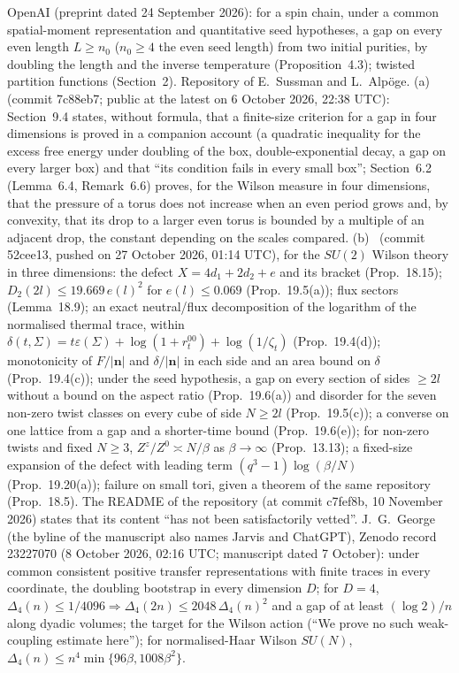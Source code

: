 \documentclass[11pt,a4paper]{article}
\theoremstyle{plain}
\theoremstyle{definition}
\theoremstyle{remark}
\numberwithin{equation}{section}
\begin{document}
 OpenAI \cite{OAIH26} (preprint dated 24 September 2026): for a spin chain, under a common spatial-moment representation and quantitative seed hypotheses, a gap on every even length $L\ge n_0$ ($n_0\ge4$ the even seed length) from two initial purities, by doubling the length and the inverse temperature (Proposition~4.3); twisted partition functions (Section~2).
 Repository \cite{SA26} of E.~Sussman and L.~Alp\"oge. (a)~ (commit 7c88eb7; public at the latest on 6 October 2026, 22:38 UTC): Section~9.4 states, without formula, that a finite-size criterion for a gap in four dimensions is proved in a companion account
(a quadratic inequality for the excess free energy under doubling of the box, double-exponential decay, a gap on every larger box) and that ``its condition fails in every small box''; Section~6.2 (Lemma~6.4, Remark~6.6) proves, for the Wilson measure in four dimensions,
that the pressure of a torus does not increase when an even period grows and, by convexity, that its drop to a larger even torus is bounded by a multiple of an adjacent drop, the constant depending on the scales compared.
(b)~ (commit 52cee13, pushed on 27 October 2026, 01:14 UTC), for the $SU(2)$ Wilson theory in three dimensions: the defect $X=4d_1+2d_2+e$ and its bracket (Prop.~18.15); $D_2(2l)\le19.669\,e(l)^2$ for $e(l)\le0.069$ (Prop.~19.5(a));
flux sectors (Lemma~18.9); an exact neutral/flux decomposition of the logarithm of the normalised thermal trace, within $\delta(t,\Sigma)=t\varepsilon(\Sigma)+\log(1+r_t^{00})+\log(1/\zeta_t)$ (Prop.~19.4(d)); monotonicity of $F/|\mathbf n|$ and $\delta/|\mathbf n|$ in each side and an area bound on $\delta$ (Prop.~19.4(c));
under the seed hypothesis, a gap on every section of sides $\ge2l$ without a bound on the aspect ratio (Prop.~19.6(a)) and disorder for the seven non-zero twist classes on every cube of side $N\ge2l$ (Prop.~19.5(c)); a converse on one lattice from a gap and a shorter-time bound (Prop.~19.6(e)); for non-zero twists and fixed $N\ge3$, $Z^z/Z^0\asymp N/\beta$ as $\beta\to\infty$ (Prop.~13.13);
a fixed-size expansion of the defect with leading term $(q^3-1)\log(\beta/N)$ (Prop.~19.20(a)); failure on small tori, given a theorem of the same repository (Prop.~18.5). The README of the repository (at commit c7fef8b, 10 November 2026) states that its content ``has not been satisfactorily vetted''.
 J.~G.~George \cite{Geo26} (the byline of the manuscript also names Jarvis and ChatGPT), Zenodo record 23227070 (8 October 2026, 02:16 UTC; manuscript dated 7 October): under common consistent positive transfer representations with finite traces in every coordinate, the doubling bootstrap in every dimension $D$; for $D=4$, $\Delta_4(n)\le1/4096\Rightarrow\Delta_4(2n)\le2048\,\Delta_4(n)^2$ and a gap of at least $(\log2)/n$ along dyadic volumes; the target for the Wilson action (``We prove no such weak-coupling estimate here''); for normalised-Haar Wilson $SU(N)$, $\Delta_4(n)\le n^4\min\{96\beta,1008\beta^2\}$.
\end{document}
